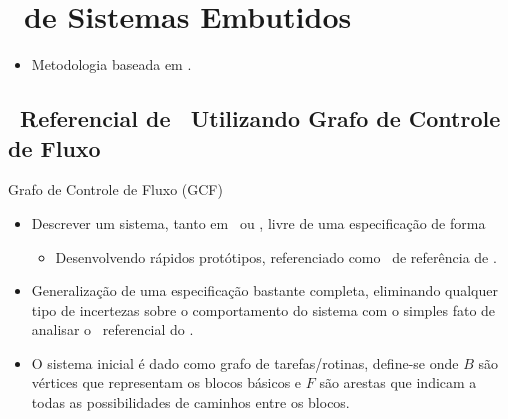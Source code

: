 \section{\Design\ de Sistemas Embutidos}

   \begin{frame}
      \begin{itemize}
         \item Metodologia baseada em \parencite{Sass2010, Arato2003, Arato2005, Mann2007, Hassine2017}.
      \end{itemize}
   \end{frame}

   \subsection{\Design\ Referencial de \Software\ Utilizando Grafo de Controle de Fluxo}

   \begin{frame}{Grafo de Controle de Fluxo (GCF)} \vspace{-1em}
      \begin{itemize}
         \setlength{\itemsep}{1.2em}
         \item Descrever um sistema, tanto em \software\ ou \hardware, livre de uma especificação de forma
         \begin{itemize}
            \item Desenvolvendo rápidos protótipos, referenciado como \design\ de referência de \software.
         \end{itemize} 
      
         \item Generalização de uma especificação bastante completa, eliminando qualquer tipo de incertezas sobre o comportamento do sistema com o simples fato de analisar o \design\ referencial do \software.
         
         \item O sistema inicial é dado como grafo de tarefas/rotinas, define-se  onde $B$ são vértices que representam os blocos básicos e $F$ são arestas que indicam a todas as possibilidades de caminhos entre os blocos. 
               
      \end{itemize}
   \end{frame}

